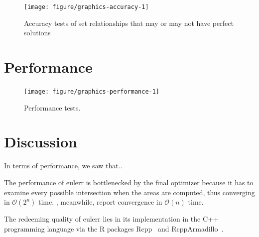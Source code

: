 \documentclass[
  a4paper,
  nofonts,
  nobib,
  titlepage,
  justified,
  marginals=raggedouter,
  nohyper
]{tufte-handout}\usepackage[]{graphicx}\usepackage[]{color}
\newenvironment{knitrout}{}{} %
\newcommand{\pkg}[1]{{\fontseries{b}\selectfont #1}}
\begin{document}
\begin{figure}[hbtp!]
\begin{knitrout}
\color{fgcolor}

{\centering \texttt{[image: figure/graphics-accuracy-1]} 

}



\end{knitrout}
\caption{Accuracy tests of set relationships that may or may not have perfect solutions}
\label{fig:accuracy}
\end{figure}

\section{Performance}
\label{sec:performance}

\begin{figure}[hbtp!]
\begin{knitrout}
\color{fgcolor}

{\centering \texttt{[image: figure/graphics-performance-1]} 

}



\end{knitrout}
\caption{Performance tests.}
\label{fig:performance}
\end{figure}

\section{Discussion}
\label{sec:discussion}

In terms of performance, we saw that..

The performance of \pkg{eulerr} is bottlenecked by the final optimizer because
it has to examine every possible intersection when the areas are computed, thus
converging in $\mathcal{O}(2^n)$ time. \citet{wilkinson_2012}, meanwhile, report
convergence in $\mathcal{O}(n)$ time.

The redeeming quality of \pkg{eulerr} lies
in its implementation in the C++ programming language via the \pkg{R} packages
\pkg{Rcpp}~\citep{eddelbuettel_2011} and \pkg{RcppArmadillo}~\citep{eddelbuettel_2014}.



\end{document}
